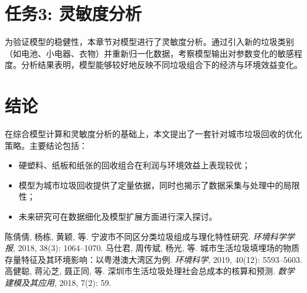 \documentclass[11pt,a4paper]{ctexart} %
\begin{document}
\section{任务3: 灵敏度分析}
为验证模型的稳健性，本章节对模型进行了灵敏度分析。通过引入新的垃圾类别（如电池、小电器、衣物）并重新归一化数据，考察模型输出对参数变化的敏感程度。分析结果表明，模型能够较好地反映不同垃圾组合下的经济与环境效益变化。

\section{结论}
在综合模型计算和灵敏度分析的基础上，本文提出了一套针对城市垃圾回收的优化策略。主要结论包括：
\begin{itemize}
  \item 硬塑料、纸板和纸张的回收组合在利润与环境效益上表现较优；
  \item 模型为城市垃圾回收提供了定量依据，同时也揭示了数据采集与处理中的局限性；
  \item 未来研究可在数据细化及模型扩展方面进行深入探讨。
\end{itemize}

\newpage
\begin{thebibliography}{99}
 陈倩倩, 杨栋, 黄颖, 等. 宁波市不同区分类垃圾组成与理化特性研究. \textit{环境科学学报}, 2018, 38(3): 1064--1070.
 马仕君, 周传斌, 杨光, 等. 城市生活垃圾填埋场的物质存量特征及其环境影响：以粤港澳大湾区为例. \textit{环境科学}, 2019, 40(12): 5593--5603.
 高健聪, 蒋沁芝, 聂正同, 等. 深圳市生活垃圾处理社会总成本的核算和预测. \textit{数学建模及其应用}, 2018, 7(2): 59.
\end{thebibliography}
\end{document}
